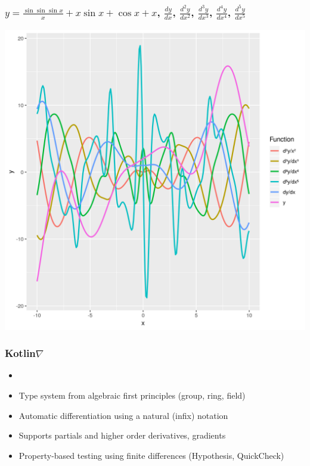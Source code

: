 \documentclass{beamer}
\begin{document}
    \begin{frame}
        \frametitle{$y = \frac{\sin{\sin{\sin{x}}}}{x} + x \sin{x} + \cos{x} + x$, $\frac{dy}{dx}$, $\frac{d^{2}y}{dx^2}$, $\frac{d^{3}y}{dx^3}$, $\frac{d^{4}y}{dx^4}$, $\frac{d^{5}y}{dx^5}$}
        \begin{center}
            \includegraphics[scale=0.4]{plot.png}
        \end{center}
    \end{frame}

    \begin{frame}
        \frametitle{Kotlin\texorpdfstring{$\nabla$}{}}
        \begin{itemize}
            \item
            \item Type system from algebraic first principles (group, ring, field)
            \item Automatic differentiation using a natural (infix) notation
            \item Supports partials and higher order derivatives, gradients
            \item Property-based testing using finite differences (Hypothesis, QuickCheck)
        \end{itemize}
    \end{frame}
\end{document}
